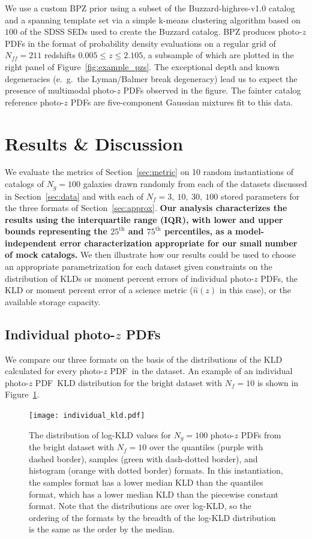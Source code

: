 \documentclass[\docopts]{\docclass}
\newcommand{\pz}{photo-$z$ PDF}
\newcommand{\mgdata}{bright\xspace}
\begin{document}
We use a custom BPZ prior using a subset of the Buzzard-highres-v1.0 catalog 
and a spanning template set via a simple k-means clustering algorithm based on 
$100$ of the SDSS SEDs used to create the Buzzard catalog.
BPZ produces \pz s in the format of probability density evaluations on a 
regular grid of $N_{ff}=211$ redshifts $0.005\leq z\leq2.105$, a subsample of 
which are plotted in the right panel of Figure~\ref{fig:example_pzs}.
The exceptional depth and known degeneracies (e.~g.~the Lyman/Balmer break 
degeneracy) lead us to expect the presence of multimodal \pz s observed in the 
figure.
The fainter catalog reference \pz s are five-component Gaussian mixtures fit to 
this data.


\section{Results \& Discussion}
\label{sec:results}

We evaluate the metrics of Section~\ref{sec:metric} on 10 random instantiations 
of catalogs of $N_{g}=100$ galaxies drawn randomly from each of the datasets 
discussed in Section~\ref{sec:data} and with each of $N_{f}=3,\ 10,\ 30,\ 100$ 
stored parameters for the three formats of Section~\ref{sec:approx}.
\textbf{Our analysis characterizes the results using the interquartile range 
(IQR), with lower and upper bounds representing the $25^{\mathrm{th}}$ and 
$75^{\mathrm{th}}$ percentiles, as a model-independent error characterization 
appropriate for our small number of mock catalogs.}
We then illustrate how our results could be used to choose an appropriate 
parametrization for each dataset given constraints on the distribution of KLDs 
or moment percent errors of individual \pz s, the KLD or moment percent error 
of a science metric ($\hat{n}(z)$ in this case), or the available storage 
capacity.


\subsection{Individual \pz s}
\label{sec:individual_results}

We compare our three formats on the basis of the distributions of the KLD 
calculated for every \pz\ in the dataset.
An example of an individual \pz\ KLD distribution for the \mgdata dataset with 
$N_{f}=10$ is shown in Figure~\ref{fig:individual}.
\begin{figure}
  \begin{center}
    \texttt{[image: individual\_kld.pdf]}
    \caption{The distribution of log-KLD values for $N_{g}=100$ \pz s from the 
\mgdata dataset with $N_{f}=10$ over the quantiles (purple with dashed border), 
samples (green with dash-dotted border), and histogram (orange with dotted 
border) formats.
    In this instantiation, the samples format has a lower median KLD than the 
quantiles format, which has a lower median KLD than the piecewise constant 
format.
    Note that the distributions are over log-KLD, so the ordering of the 
formats by the breadth of the log-KLD distribution is the same as the order by 
the median.
    \label{fig:individual}}
  \end{center}
\end{figure}
\end{document}
